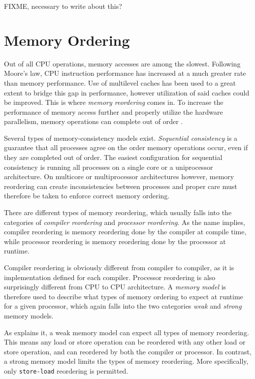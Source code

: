 FIXME, necessary to write about this?


\section{Memory Ordering}
\label{sec:memory_ordering}

Out of all CPU operations, memory accesses are among the slowest. Following Moore's law, CPU instruction performance has increased at a much greater rate than memory performance. Use of multilevel caches has been used to a great extent to bridge this gap in performance, however utilization of said caches could be improved. This is where \textit{memory reordering} comes in. To increase the performance of memory access further and properly utilize the hardware parallelism, memory operations can complete out of order \citep{mckenney2007memory}.

Several types of memory\hyp{}consistency models exist. \textit{Sequential consistency} is a guarantee that all processes agree on the order memory operations occur, even if they are completed out of order. The easiest configuration for sequential consistency is running all processes on a single core or a uniprocessor architecture. On multicore or multiprocessor architectures however, memory reordering can create inconsistencies between processes and proper care must therefore be taken to enforce correct memory ordering. 

There are different types of memory reordering, which usually falls into the categories of \textit{compiler reordering} and \textit{processor reordering}. As the name implies, compiler reordering is memory reordering done by the compiler at compile time, while processor reordering is memory reordering done by the processor at runtime.

Compiler reordering is obviously different from compiler to compiler, as it is implementation defined for each compiler. Processor reordering is also surprisingly different from CPU to CPU architecture. A \textit{memory model} is therefore used to describe what types of memory ordering to expect at runtime for a given processor, which again falls into the two categories \textit{weak} and \textit{strong} memory models.

As \citet{preshing2012weakstrong} explains it, a weak memory model can expect all types of memory reordering. This means any load or store operation can be reordered with any other load or store operation, and can reordered by both the compiler or processor. In contrast, a strong memory model limits the types of memory reordering. More specifically, only \texttt{store\hyp{}load} reordering is permitted. 

